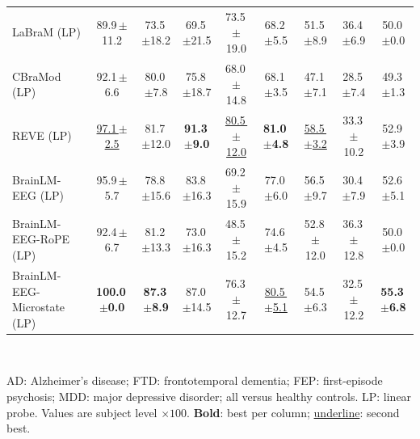 \begin{table}[htbp]
{\begin{tabular}{l cc cc cc cc}
    \midrule
    LaBraM (LP) & 89.9\,{\scriptsize$\pm$11.2} & 73.5\,{\scriptsize$\pm$18.2} & 69.5\,{\scriptsize$\pm$21.5} & 73.5\,{\scriptsize$\pm$19.0} & 68.2\,{\scriptsize$\pm$5.5} & 51.5\,{\scriptsize$\pm$8.9} & 36.4\,{\scriptsize$\pm$6.9} & 50.0\,{\scriptsize$\pm$0.0} \\
    CBraMod (LP) & 92.1\,{\scriptsize$\pm$6.6} & 80.0\,{\scriptsize$\pm$7.8} & 75.8\,{\scriptsize$\pm$18.7} & 68.0\,{\scriptsize$\pm$14.8} & 68.1\,{\scriptsize$\pm$3.5} & 47.1\,{\scriptsize$\pm$7.1} & 28.5\,{\scriptsize$\pm$7.4} & 49.3\,{\scriptsize$\pm$1.3} \\
    REVE (LP) & \underline{97.1\,{\scriptsize$\pm$2.5}} & 81.7\,{\scriptsize$\pm$12.0} & \textbf{91.3\,{\scriptsize$\pm$9.0}} & \underline{80.5\,{\scriptsize$\pm$12.0}} & \textbf{81.0\,{\scriptsize$\pm$4.8}} & \underline{58.5\,{\scriptsize$\pm$3.2}} & 33.3\,{\scriptsize$\pm$10.2} & 52.9\,{\scriptsize$\pm$3.9} \\
    \midrule
    BrainLM-EEG (LP) & 95.9\,{\scriptsize$\pm$5.7} & 78.8\,{\scriptsize$\pm$15.6} & 83.8\,{\scriptsize$\pm$16.3} & 69.2\,{\scriptsize$\pm$15.9} & 77.0\,{\scriptsize$\pm$6.0} & 56.5\,{\scriptsize$\pm$9.7} & 30.4\,{\scriptsize$\pm$7.9} & 52.6\,{\scriptsize$\pm$5.1} \\
    BrainLM-EEG-RoPE (LP) & 92.4\,{\scriptsize$\pm$6.7} & 81.2\,{\scriptsize$\pm$13.3} & 73.0\,{\scriptsize$\pm$16.3} & 48.5\,{\scriptsize$\pm$15.2} & 74.6\,{\scriptsize$\pm$4.5} & 52.8\,{\scriptsize$\pm$12.0} & 36.3\,{\scriptsize$\pm$12.8} & 50.0\,{\scriptsize$\pm$0.0} \\
    BrainLM-EEG-Microstate (LP) & \textbf{100.0\,{\scriptsize$\pm$0.0}} & \textbf{87.3\,{\scriptsize$\pm$8.9}} & 87.0\,{\scriptsize$\pm$14.5} & 76.3\,{\scriptsize$\pm$12.7} & \underline{80.5\,{\scriptsize$\pm$5.1}} & 54.5\,{\scriptsize$\pm$6.3} & 32.5\,{\scriptsize$\pm$12.2} & \textbf{55.3\,{\scriptsize$\pm$6.8}} \\
    \bottomrule
  \end{tabular}%
  }
  \\[3pt]
  \begin{minipage}{\linewidth}\footnotesize\raggedright
    AD: Alzheimer's disease; FTD: frontotemporal dementia; FEP: first-episode psychosis; MDD: major depressive disorder; all versus healthy controls. LP: linear probe. Values are subject level $\times 100$. \textbf{Bold}: best per column; \underline{underline}: second best.
  \end{minipage}
\end{table}
